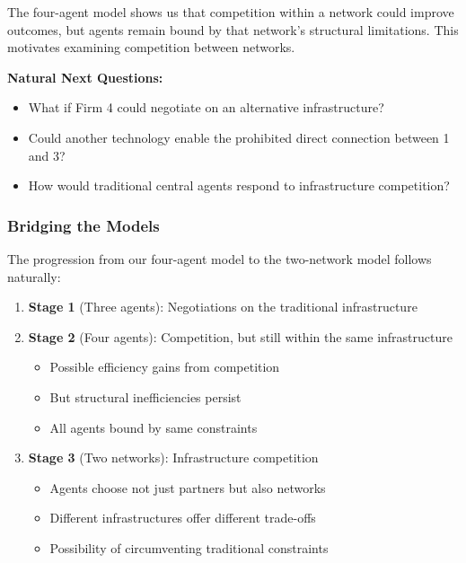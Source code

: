 The four-agent model shows us that competition within a network could improve outcomes, but agents remain bound by that network's structural limitations. This motivates examining competition between networks.


\textbf{Natural Next Questions:}
\begin{itemize}
    \item What if Firm 4 could negotiate on an alternative infrastructure?
    \item Could another technology enable the prohibited direct connection between 1 and 3?
    \item How would traditional central agents respond to infrastructure competition?
\end{itemize}

\subsubsection{Bridging the Models}

The progression from our four-agent model to the two-network model follows naturally:

\begin{enumerate}
    \item \textbf{Stage 1} (Three agents): Negotiations on the traditional infrastructure
    
    \item \textbf{Stage 2} (Four agents): Competition, but still within the same infrastructure
    \begin{itemize}
        \item Possible efficiency gains from competition
        \item But structural inefficiencies persist
        \item All agents bound by same constraints
    \end{itemize}
    
    \item \textbf{Stage 3} (Two networks): Infrastructure competition
    \begin{itemize}
        \item Agents choose not just partners but also networks
        \item Different infrastructures offer different trade-offs
        \item Possibility of circumventing traditional constraints
    \end{itemize}
\end{enumerate}

